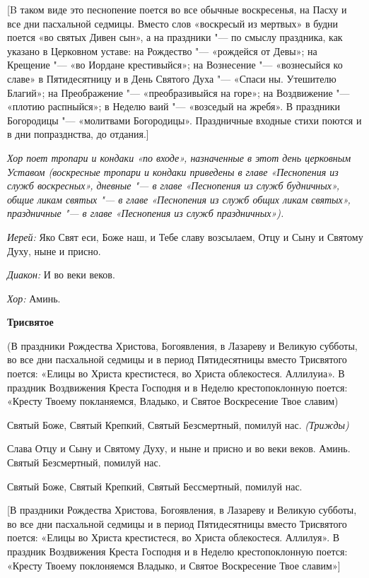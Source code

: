  [B таком виде это песнопение поется во все обычные воскресенья, на Пасху и все дни пасхальной седмицы. Вместо слов «воскресый из мертвых» в будни поется «во святых Дивен сын», а на праздники "--- по смыслу праздника, как указано в Церковном уставе: на Рождество "--- «рождейся от Девы»; на Крещение "--- «во Иордане крестивыйся»; на Вознесение "--- «вознесыйся ко славе» в Пятидесятницу и в День Святого Духа "--- «Спаси ны. Утешителю Благий»; на Преображение "--- «преобразивыйся на горе»; на Воздвижение "--- «плотию распныйся»; в Неделю ваий "--- «возседый на жребя». В праздники Богородицы "--- «молитвами Богородицы». Праздничные входные стихи поются и в дни попразднства, до отдания.] 


 {\itshape Хор поет тропари и кондаки «по входе», назначенные в этот день церковным Уставом (воскресные тропари и кондаки приведены в главе «Песнопения из служб воскресных», дневные "--- в главе «Песнопения из служб будничных», общие ликам святых "--- в главе «Песнопения из служб общих ликам святых», праздничные "--- в главе «Песнопения из служб праздничных»).}

 {\itshape Иерей:} Яко Свят еси, Боже наш, и Тебе славу возсылаем, Отцу и Сыну и Святому Духу, ныне и присно.

 {\itshape Диакон:} И во веки веков.

 {\itshape Хор:} Аминь.

 

\medskip 

{\bfseries Трисвятое }

 (В праздники Рождества Христова, Богоявления, в Лазареву и Великую субботы, во все дни пасхальной седмицы и в период Пятидесятницы вместо Трисвятого поется: «Елицы во Христа крестистеся, во Христа облекостеся. Аллилуиа». В праздник Воздвижения Креста Господня и в Неделю крестопоклонную поется: «Кресту Твоему покланяемся, Владыко, и Святое Воскресение Твое славим)

 Святый Боже, Святый Крепкий, Святый Безсмертный, помилуй нас. {\itshape (Трижды)}

 Слава Отцу и Сыну и Святому Духу, и ныне и присно и во веки веков. Аминь. Святый Безсмертный, помилуй нас.

 Святый Боже, Святый Крепкий, Святый Бессмертный, помилуй нас.

 [В праздники Рождества Христова, Богоявления, в Лазареву и Великую субботы, во все дни пасхальной седмицы и в период Пятидесятницы вместо Трисвятого поется: «Елицы во Христа крестистеся, во Христа облекостеся. Аллилуя». В праздник Воздвижения Креста Господня и в Неделю крестопоклонную поется: «Кресту Твоему поклоняемся Владыко, и Святое Воскресение Твое славим»]

